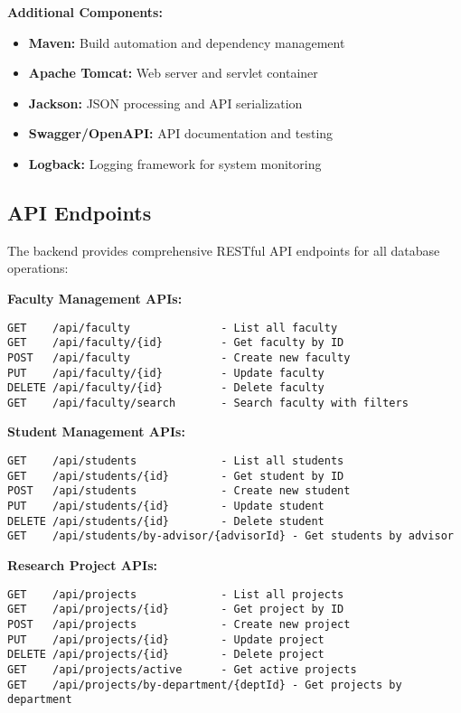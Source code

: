 \documentclass[12pt,a4paper]{article}
\begin{document}
\textbf{Additional Components:}
\begin{itemize}
    \item \textbf{Maven:} Build automation and dependency management
    \item \textbf{Apache Tomcat:} Web server and servlet container
    \item \textbf{Jackson:} JSON processing and API serialization
    \item \textbf{Swagger/OpenAPI:} API documentation and testing
    \item \textbf{Logback:} Logging framework for system monitoring
\end{itemize}

\subsection{API Endpoints}
The backend provides comprehensive RESTful API endpoints for all database operations:

\textbf{Faculty Management APIs:}
\begin{lstlisting}[style=sqlstyle]
GET    /api/faculty              - List all faculty
GET    /api/faculty/{id}         - Get faculty by ID
POST   /api/faculty              - Create new faculty
PUT    /api/faculty/{id}         - Update faculty
DELETE /api/faculty/{id}         - Delete faculty
GET    /api/faculty/search       - Search faculty with filters
\end{lstlisting}

\textbf{Student Management APIs:}
\begin{lstlisting}[style=sqlstyle]
GET    /api/students             - List all students
GET    /api/students/{id}        - Get student by ID
POST   /api/students             - Create new student
PUT    /api/students/{id}        - Update student
DELETE /api/students/{id}        - Delete student
GET    /api/students/by-advisor/{advisorId} - Get students by advisor
\end{lstlisting}

\textbf{Research Project APIs:}
\begin{lstlisting}[style=sqlstyle]
GET    /api/projects             - List all projects
GET    /api/projects/{id}        - Get project by ID
POST   /api/projects             - Create new project
PUT    /api/projects/{id}        - Update project
DELETE /api/projects/{id}        - Delete project
GET    /api/projects/active      - Get active projects
GET    /api/projects/by-department/{deptId} - Get projects by department
\end{lstlisting}
\end{document}
